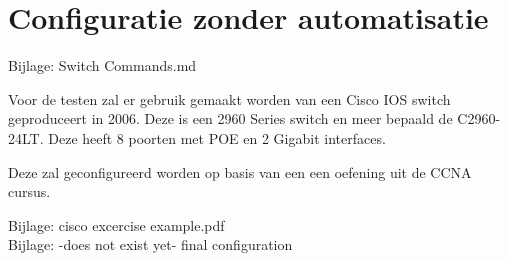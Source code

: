 
\chapter{Configuratie zonder automatisatie}
\label{ch:configuratie}


Bijlage: Switch Commands.md

Voor de testen zal er gebruik gemaakt worden van een Cisco IOS switch geproduceert in 2006. Deze is een 2960 Series switch en meer bepaald de C2960-24LT. Deze heeft 8 poorten met POE en 2 Gigabit interfaces. 

Deze zal geconfigureerd worden op basis van een een oefening uit de CCNA cursus.

Bijlage: cisco excercise example.pdf\\
Bijlage: -does not exist yet- final configuration

